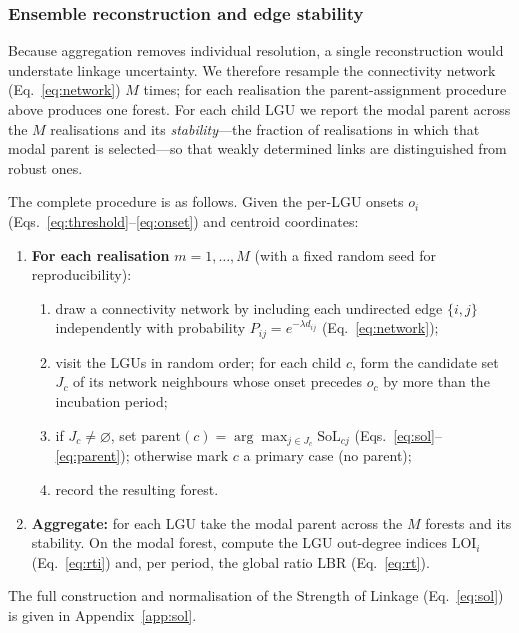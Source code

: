 \documentclass[a4paper,11pt]{article}
\begin{document}
\subsubsection{Ensemble reconstruction and edge stability}
\label{sec:ensemble}
Because aggregation removes individual resolution, a single reconstruction would
understate linkage uncertainty. We therefore resample the connectivity network
(Eq.~\ref{eq:network}) $M$ times; for each realisation the parent-assignment
procedure above produces one forest. For each child LGU we report the modal parent
across the $M$ realisations and its \emph{stability}---the fraction of
realisations in which that modal parent is selected---so that weakly determined
links are distinguished from robust ones.

The complete procedure is as follows. Given the per-LGU onsets $o_i$
(Eqs.~\ref{eq:threshold}--\ref{eq:onset}) and centroid coordinates:
\begin{enumerate}
\item \textbf{For each realisation} $m = 1,\dots,M$ (with a fixed random seed for
reproducibility):
  \begin{enumerate}
  \item draw a connectivity network by including each undirected edge $\{i,j\}$
  independently with probability $P_{ij}=e^{-\lambda d_{ij}}$ (Eq.~\ref{eq:network});
  \item visit the LGUs in random order; for each child $c$, form the candidate set
  $J_c$ of its network neighbours whose onset precedes $o_c$ by more than the
  incubation period;
  \item if $J_c\neq\varnothing$, set $\mathrm{parent}(c)=\arg\max_{j\in J_c}
  \mathrm{SoL}_{cj}$ (Eqs.~\ref{eq:sol}--\ref{eq:parent}); otherwise mark $c$ a
  primary case (no parent);
  \item record the resulting forest.
  \end{enumerate}
\item \textbf{Aggregate:} for each LGU take the modal parent across the $M$ forests
and its stability. On the modal forest, compute the LGU out-degree indices
$\mathrm{LOI}_i$ (Eq.~\ref{eq:rti}) and, per period, the global ratio $\mathrm{LBR}$
(Eq.~\ref{eq:rt}).
\end{enumerate}
The full construction and normalisation of the Strength of Linkage
(Eq.~\ref{eq:sol}) is given in Appendix~\ref{app:sol}.
\end{document}
